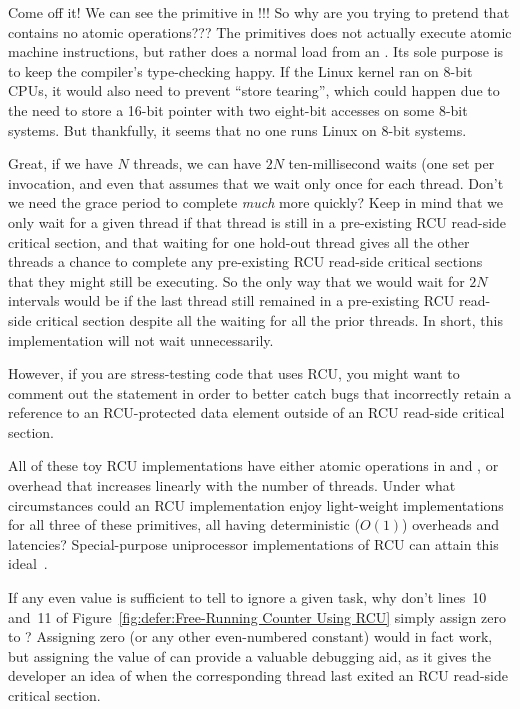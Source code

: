 \begin{enumerate}
\QuickQ{}
	Come off it!
	We can see the  primitive in
	!!!
	So why are you trying to pretend that 
	contains no atomic operations???
\QuickA{}
	The  primitives does not actually execute
	atomic machine instructions, but rather does a normal load
	from an .
	Its sole purpose is to keep the compiler's type-checking happy.
	If the Linux kernel ran on 8-bit CPUs, it would also need to
	prevent ``store tearing'', which could happen due to the need
	to store a 16-bit pointer with two eight-bit accesses on some
	8-bit systems.
	But thankfully, it seems that no one runs Linux on 8-bit systems.

\QuickQ{}
	Great, if we have $N$ threads, we can have $2N$ ten-millisecond
	waits (one set per  invocation,
	and even that assumes that we wait only once for each thread.
	Don't we need the grace period to complete \emph{much} more quickly?
\QuickA{}
	Keep in mind that we only wait for a given thread if that thread
	is still in a pre-existing RCU read-side critical section,
	and that waiting for one hold-out thread gives all the other
	threads a chance to complete any pre-existing RCU read-side
	critical sections that they might still be executing.
	So the only way that we would wait for $2N$ intervals
	would be if the last thread still remained in a pre-existing
	RCU read-side critical section despite all the waiting for
	all the prior threads.
	In short, this implementation will not wait unnecessarily.

	However, if you are stress-testing code that uses RCU, you
	might want to comment out the  statement in
	order to better catch bugs that incorrectly retain a reference
	to an RCU-protected data element outside of an RCU
	read-side critical section.

\QuickQ{}
	All of these toy RCU implementations have either atomic operations
	in  and ,
	or 
	overhead that increases linearly with the number of threads.
	Under what circumstances could an RCU implementation enjoy
	light-weight implementations for all three of these primitives,
	all having deterministic ($O\left(1\right)$) overheads and latencies?
\QuickA{}
	Special-purpose uniprocessor implementations of RCU can attain
	this ideal~\cite{PaulEMcKenney2009BloatwatchRCU}.

\QuickQ{}
	If any even value is sufficient to tell 
	to ignore a given task, why don't lines~10 and~11 of
	Figure~\ref{fig:defer:Free-Running Counter Using RCU}
	simply assign zero to ?
\QuickA{}
	Assigning zero (or any other even-numbered constant)
	would in fact work, but assigning the value of
	 can provide a valuable debugging aid,
	as it gives the developer an idea of when the corresponding
	thread last exited an RCU read-side critical section.


\end{enumerate}

